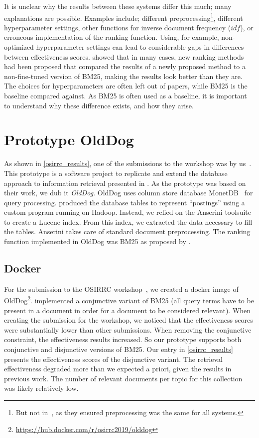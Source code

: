 It is unclear why the results between these systems differ this much; many explanations are possible. Examples include; different preprocessing\footnote{But not in~\citeauthor{OldDog}, as they ensured preprocessing was the same for all systems.}, different hyperparameter settings, other functions for inverse document frequency ($idf$), or erroneous implementation of the ranking function. Using, for example, non-optimized hyperparameter settings can lead to considerable gaps in differences between effectiveness scores. \citet{weak-baselines} showed that in many cases, new ranking methods had been proposed that compared the results of a newly proposed method to a non-fine-tuned version of BM25, making the results look better than they are. The choices for hyperparameters are often left out of papers, while BM25 is the baseline compared against. As BM25 is often used as a baseline, it is important to understand why these difference exists, and how they arise.

\section{Prototype OldDog}
As shown in \cref{osirrc_results}, one of the submissions to the workshop was by us~\citep{olddog-docker}. This prototype is a software project to replicate and extend the database approach to information retrieval presented in \citet{OldDog}. As the prototype was based on their work, we dub it \emph{OldDog}. OldDog uses column store database MonetDB~\citep{monet} for query processing. 
 produced the database tables to represent ``postings'' using a custom program running on Hadoop.
Instead, we relied on the Anserini toolsuite~\cite{anserini} to create a
Lucene index. From this index, we extracted the data necessary to fill the tables. Anserini takes care of standard document preprocessing. The ranking function implemented in OldDog was BM25 as proposed by \citet{bm25-robertson}.

\subsection{Docker}
For the submission to the OSIRRC workshop~\citep{OSIRRC}, we created a docker image of OldDog\footnote{\url{https://hub.docker.com/r/osirrc2019/olddog}}.  implemented a conjunctive variant of BM25 (all query terms have to be present in a document in order for a document to be considered relevant). When creating the submission for the workshop, we noticed that the effectiveness scores were substantially lower than other submissions. When removing the conjunctive constraint, the effectiveness results increased. So our prototype supports both conjunctive and disjunctive versions of BM25. Our entry in \cref{osirrc_results} presents the effectiveness scores of the disjunctive variant. The retrieval effectiveness degraded more than we expected a priori, given the results in previous work. The number of relevant documents per topic for this collection was likely relatively low.

